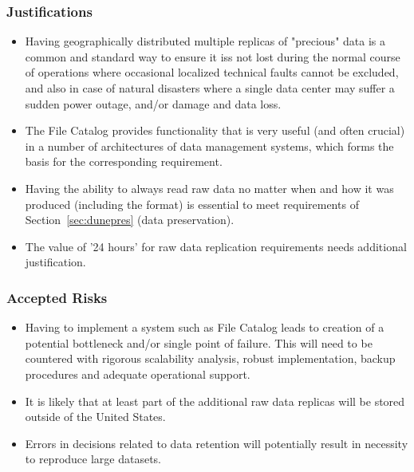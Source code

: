 \subsubsection{Justifications}
\begin{itemize}
\item Having geographically distributed multiple replicas of "precious" data is a common and standard way
to ensure it iss not lost during the normal course of operations where occasional localized technical
faults cannot be excluded, and also in case of natural disasters where a single data center may suffer
a sudden power outage, and/or damage and data loss.

\item The File Catalog provides functionality that is very useful (and often crucial) in a number of architectures
of data management systems, which forms the basis for the corresponding requirement.

\item Having the ability to always read raw data no matter when and how it was produced (including the format)
is essential to meet requirements of Section~\ref{sec:dunepres} (data preservation).

\item The value of '24 hours' for raw data replication requirements needs additional justification. 
\end{itemize}

\subsubsection{Accepted Risks}
\begin{itemize}
\item Having to implement a system such as File Catalog leads to creation of a potential bottleneck
and/or single point of failure. This will need to be countered with rigorous scalability analysis,
robust implementation, backup procedures and adequate operational support.

\item It is likely that at least part of the additional raw data replicas will be stored outside of the United States.

\item Errors in decisions related to data retention will potentially result in necessity to reproduce large datasets.
\end{itemize}
